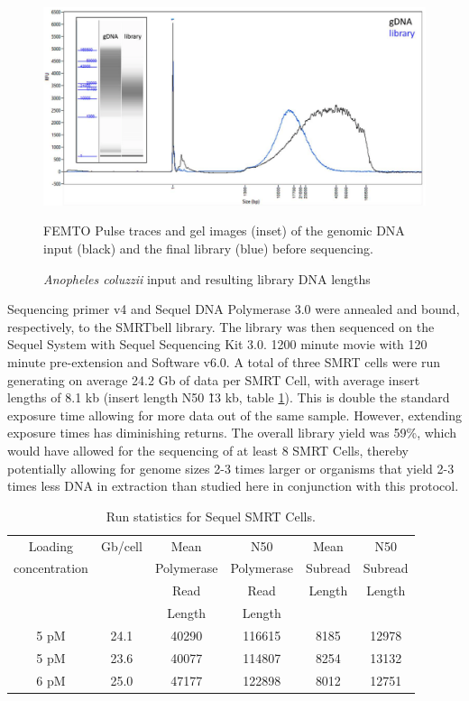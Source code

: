 \begin{figure}[htbp!]
\caption{\textit{Anopheles coluzzii} input and resulting library DNA lengths}
\label{figure:fempto}
\begin{centering}
\includegraphics[width=.85\textwidth]{fempto.png}
\par{ FEMTO Pulse traces and gel images (inset) of the genomic DNA input (black) and the final library (blue) before sequencing. }
\end{centering}
\end{figure}

\par{
Sequencing primer v4 and Sequel DNA Polymerase 3.0 were annealed and bound, respectively, to the SMRTbell library. The library was then sequenced on the Sequel System with Sequel Sequencing Kit 3.0. 1200 minute movie with 120 minute pre-extension and Software v6.0. A total of three SMRT cells were run generating on average 24.2 Gb of data per SMRT Cell, with average insert lengths of 8.1 kb (insert length N50 \~13 kb, table \ref{table:dataamount}). This is double the standard exposure time allowing for more data out of the same sample. However, extending exposure times has diminishing returns. The overall library yield was 59\%, which would have allowed for the sequencing of at least 8 SMRT Cells, thereby potentially allowing for genome sizes 2-3 times larger or organisms that yield 2-3 times less DNA in extraction than studied here in conjunction with this protocol.
}

\begin{table}[htbp!]
\caption{Run statistics for Sequel SMRT Cells.}\label{table:dataamount}
\begin{tabular}{| c | c | c | c | c | c |}
\hline
Loading & Gb/cell & Mean  & N50 &  Mean &  N50  \\
concentration & & Polymerase & Polymerase & Subread & Subread \\
& & Read & Read & Length & Length \\ 
& & Length &Length & & \\\hline
5 pM & 24.1 & 40290 & 116615 & 8185 & 12978 \\\hline
5 pM & 23.6 & 40077 & 114807 & 8254 & 13132 \\\hline
6 pM & 25.0 & 47177 & 122898 & 8012 & 12751 \\\hline
\end{tabular}
\end{table}



